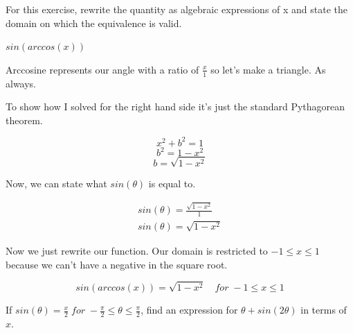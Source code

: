 \documentclass[10pt,letterpaper]{amspset}
\begin{document}
\pagebreak

\begin{problem}[165]
    For this exercise, rewrite the quantity as algebraic expressions of x and state the domain on which the equivalence is valid.    

    $sin(arccos(x))$
\end{problem}

\begin{solution}
    Arccosine represents our angle with a ratio of $\frac{x}{1}$ so let's make a triangle. As always.
    
    
    To show how I solved for the right hand side it's just the standard Pythagorean theorem.
    
    \[ x^2 + b^2 = 1\]
    \[ b^2 = 1 - x^2\]
    \[ b = \sqrt{1 - x^2}\]
    
    Now, we can state what $sin(\theta)$ is equal to.
    
    \begin{align}
        sin(\theta) = \frac{\sqrt{1 - x^2}}{1} \\[+3mm]
        sin(\theta) = \sqrt{1 - x^2}
    \end{align}
    
    Now we just rewrite our function. Our domain is restricted to $-1 \leq x \leq 1$ because we can't have a negative in the square root.
    
    \[\boxed{ sin(arccos(x)) = \sqrt{1 - x^2} \quad for \; -1 \leq x \leq 1 }\]
\end{solution}


\pagebreak


\begin{problem}[185]
    If $sin(\theta) = \frac{x}{2} \; for \; -\frac{\pi}{2} \leq \theta \leq \frac{\pi}{2}$, find an expression for $\theta + sin(2\theta)$ in terms of $x$.
\end{problem}
\end{document}
